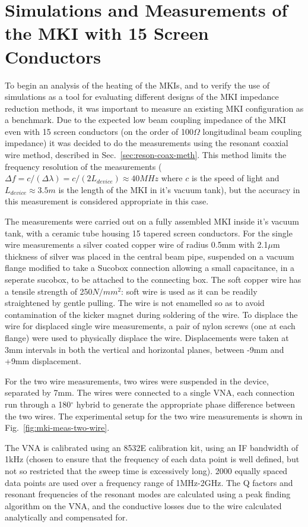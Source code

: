 \section{Simulations and Measurements of the MKI with 15 Screen Conductors}

To begin an analysis of the heating of the MKIs, and to verify the use of simulations as a tool for evaluating different designs of the MKI impedance reduction methods, it was important to measure an existing MKI configuration as a benchmark. Due to the expected low beam coupling impedance of the MKI even with 15 screen conductors (on the order of 100$\Omega$ longitudinal beam coupling impedance) it was decided to do the measurements using the resonant coaxial wire method, described in Sec.~\ref{sec:reson-coax-meth}. This method limits the frequency resolution of the measurements ($\Delta{} f = c/ (\Delta \lambda) = c/(2L_{device}) \approx 40MHz$ where $c$ is the speed of light and $L_{device}\approx 3.5m$ is the length of the MKI in it's vacuum tank), but the accuracy in this measurement is considered appropriate in this case.

The measurements were carried out on a fully assembled MKI inside it's vacuum tank, with a ceramic tube housing 15 tapered screen conductors. For the single wire measurements a silver coated copper wire of radius 0.5mm with 2.1$\mu$m thickness of silver was placed in the central beam pipe, suspended on a vacuum flange modified to take a Sucobox connection allowing a small capacitance, in a seperate sucobox, to be attached to the connecting box. The soft copper wire has a tensile strength of 250$N/mm^{2}$: soft wire is used as it can be readily straightened by gentle pulling. The wire is not enamelled so as to avoid contamination of the kicker magnet during soldering of the wire. To displace the wire for displaced single wire measurements, a pair of nylon screws (one at each flange) were used to physically displace the wire. Displacements were taken at 3mm intervals in both the vertical and horizontal planes, between -9mm and +9mm displacement.

For the two wire measurements, two wires were suspended in the device, separated by 7mm. The wires were connected to a single VNA, each connection run through a 180$^{\circ}$ hybrid to generate the appropriate phase difference between the two wires. The experimental setup for the two wire measurements is shown in Fig.~\ref{fig:mki-meas-two-wire}.

The VNA is calibrated using an 8532E calibration kit, using an IF bandwidth of 1kHz (chosen to ensure that the frequency of each data point is well defined, but not so restricted that the sweep time is excessively long). 2000 equally spaced data points are used over a frequency range of 1MHz-2GHz. The Q factors and resonant frequencies of the resonant modes are calculated using a peak finding algorithm on the VNA, and the conductive losses due to the wire calculated analytically and compensated for.

